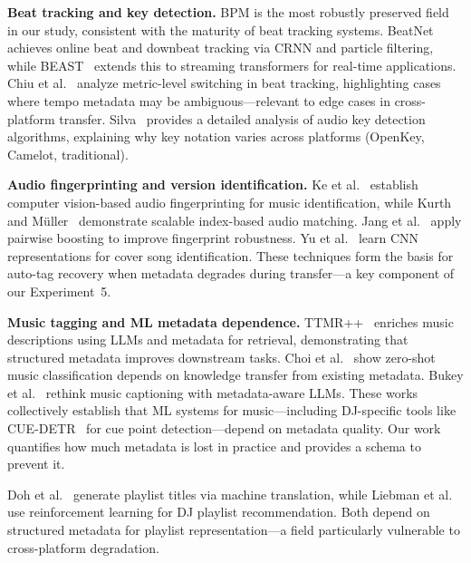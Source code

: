 \textbf{Beat tracking and key detection.} BPM is the most robustly preserved field in our study, consistent with the maturity of beat tracking systems. BeatNet~\citep{heydari2021beatnet} achieves online beat and downbeat tracking via CRNN and particle filtering, while BEAST~\citep{chang2024beast} extends this to streaming transformers for real-time applications. Chiu et al.~\citep{chiu2022beatswitching} analyze metric-level switching in beat tracking, highlighting cases where tempo metadata may be ambiguous---relevant to edge cases in cross-platform transfer. Silva~\citep{silva2025keydetection} provides a detailed analysis of audio key detection algorithms, explaining why key notation varies across platforms (OpenKey, Camelot, traditional).

\textbf{Audio fingerprinting and version identification.} Ke et al.~\citep{ke2005audio} establish computer vision-based audio fingerprinting for music identification, while Kurth and M{\"u}ller~\citep{kurth2008efficient} demonstrate scalable index-based audio matching. Jang et al.~\citep{jang2009pairwise} apply pairwise boosting to improve fingerprint robustness. Yu et al.~\citep{yu2019coversong} learn CNN representations for cover song identification. These techniques form the basis for auto-tag recovery when metadata degrades during transfer---a key component of our Experiment~5.

\textbf{Music tagging and ML metadata dependence.} TTMR++~\citep{ttmr2024} enriches music descriptions using LLMs and metadata for retrieval, demonstrating that structured metadata improves downstream tasks. Choi et al.~\citep{choi2019zeroshot} show zero-shot music classification depends on knowledge transfer from existing metadata. Bukey et al.~\citep{bukey2026musicmetadata} rethink music captioning with metadata-aware LLMs. These works collectively establish that ML systems for music---including DJ-specific tools like CUE-DETR~\citep{arguello2024cuedetr} for cue point detection---depend on metadata quality. Our work quantifies how much metadata is lost in practice and provides a schema to prevent it.

Doh et al.~\citep{doh2021playlist} generate playlist titles via machine translation, while Liebman et al.~\citep{liebman2015djmc} use reinforcement learning for DJ playlist recommendation. Both depend on structured metadata for playlist representation---a field particularly vulnerable to cross-platform degradation.




